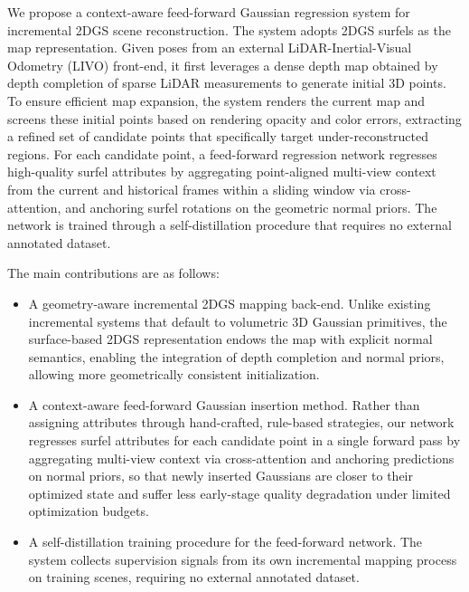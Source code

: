 \documentclass[letterpaper, 10pt, conference]{ieeeconf}
\begin{document}
We propose a context-aware feed-forward Gaussian regression system for incremental 2DGS scene reconstruction. The system adopts 2DGS surfels as the map representation. Given poses from an external LiDAR-Inertial-Visual Odometry (LIVO) front-end, it first leverages a dense depth map obtained by depth completion of sparse LiDAR measurements to generate initial 3D points. To ensure efficient map expansion, the system renders the current map and screens these initial points based on rendering opacity and color errors, extracting a refined set of candidate points that specifically target under-reconstructed regions. For each candidate point, a feed-forward regression network regresses high-quality surfel attributes by aggregating point-aligned multi-view context from the current and historical frames within a sliding window via cross-attention, and anchoring surfel rotations on the geometric normal priors. The network is trained through a self-distillation procedure that requires no external annotated dataset.

The main contributions are as follows:

\begin{itemize}
    \item A geometry-aware incremental 2DGS mapping back-end. Unlike existing incremental systems that default to volumetric 3D Gaussian primitives, the surface-based 2DGS representation endows the map with explicit normal semantics, enabling the integration of depth completion and normal priors, allowing more geometrically consistent initialization.

    \item A context-aware feed-forward Gaussian insertion method. Rather than assigning attributes through hand-crafted, rule-based strategies, our network regresses surfel attributes for each candidate point in a single forward pass by aggregating multi-view context via cross-attention and anchoring predictions on normal priors, so that newly inserted Gaussians are closer to their optimized state and suffer less early-stage quality degradation under limited optimization budgets.

    \item A self-distillation training procedure for the feed-forward network. The system collects supervision signals from its own incremental mapping process on training scenes, requiring no external annotated dataset.
\end{itemize}

\end{document}

